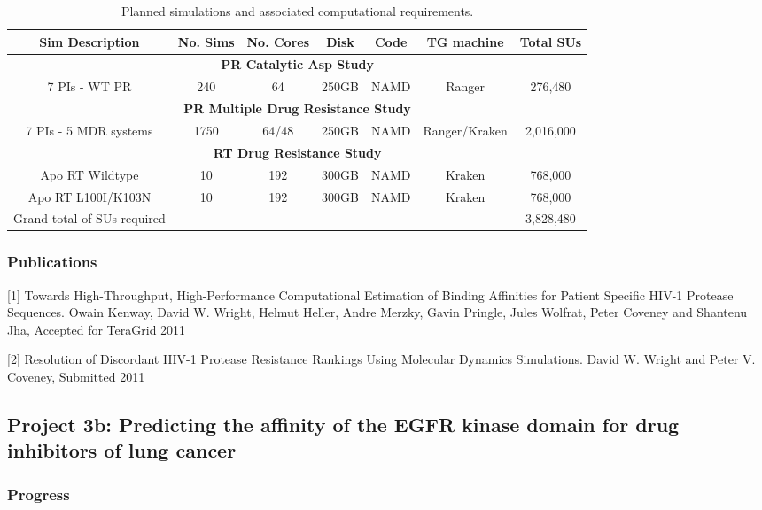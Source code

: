 \documentclass[a4paper,12pt]{article}
\begin{document}
\begin{table}[h]
\scriptsize
\centering
\begin{tabular}[b]
{|c|c|c|c|c|c|c|}
\hline
\textbf{Sim Description} & \textbf{No. Sims} &
\textbf{No. Cores} & \textbf{Disk} &
\textbf{Code} & \textbf{TG machine} & \textbf{Total SUs}\\
\hline
\multicolumn{7}{|c|}{\textbf{PR Catalytic Asp Study}}\\
\hline
7 PIs - WT PR & 240 & 64 & 250GB & NAMD & Ranger & 276,480 \\
\hline
\multicolumn{7}{|c|}{\textbf{PR Multiple Drug Resistance Study}}\\
\hline
7 PIs - 5 MDR systems & 1750 & 64/48 & 250GB & NAMD & Ranger/Kraken & 2,016,000 \\
\hline
\multicolumn{7}{|c|}{\textbf{RT Drug Resistance Study}}\\
\hline
Apo RT Wildtype & 10 & 192 & 300GB & NAMD & Kraken & 768,000\\
\hline
Apo RT L100I/K103N & 10 & 192 & 300GB & NAMD & Kraken & 768,000\\
\hline
Grand total of SUs required & & & & & & 3,828,480\\
\hline
\end{tabular} \caption{Planned simulations and associated computational requirements.}
\label{t:hiv_req}
\end{table}

\subsubsection{Publications}

[1] Towards High-Throughput, High-Performance Computational Estimation of Binding Affinities for 
Patient Specific HIV-1 Protease Sequences. Owain Kenway, David W. Wright, Helmut Heller, Andre Merzky, Gavin Pringle, Jules Wolfrat, 
Peter Coveney and Shantenu Jha, Accepted for TeraGrid 2011

[2] Resolution of Discordant HIV-1 Protease Resistance Rankings Using Molecular Dynamics Simulations. David W. Wright and Peter V. Coveney, Submitted 2011


\subsection{Project 3b: Predicting the affinity of the EGFR kinase domain for drug inhibitors of lung cancer}

\subsubsection{Progress}
\end{document}
